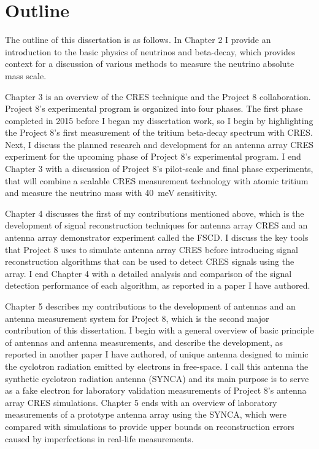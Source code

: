 \section{Outline}

The outline of this dissertation is as follows. In Chapter 2 I provide an introduction to the basic physics of neutrinos and beta-decay, which provides context for a discussion of various methods to measure the neutrino absolute mass scale. 

Chapter 3 is an overview of the CRES technique and the Project 8 collaboration. Project 8's experimental program is organized into four phases. The first phase completed in 2015 before I began my dissertation work, so I begin by highlighting the Project 8's first measurement of the tritium beta-decay spectrum with CRES. Next, I discuss the planned research and development for an antenna array CRES experiment for the upcoming phase of Project 8's experimental program. I end Chapter 3 with a discussion of Project 8's pilot-scale and final phase experiments, that will combine a scalable CRES measurement technology with atomic tritium and measure the neutrino mass with 40~meV sensitivity.

Chapter 4 discusses the first of my contributions mentioned above, which is the development of signal reconstruction techniques for antenna array CRES and an antenna array demonstrator experiment called the FSCD. I discuss the key tools that Project 8 uses to simulate antenna array CRES before introducing signal reconstruction algorithms that can be used to detect CRES signals using the array. I end Chapter 4 with a detailed analysis and comparison of the signal detection performance of each algorithm, as reported in a paper I have authored.

Chapter 5 describes my contributions to the development of antennas and an antenna measurement system for Project 8, which is the second major contribution of this dissertation. I begin with a general overview of basic principle of antennas and antenna measurements, and describe the development, as reported in another paper I have authored, of unique antenna designed to mimic the cyclotron radiation emitted by electrons in free-space. I call this antenna the synthetic cyclotron radiation antenna (SYNCA) and its main purpose is to serve as a fake electron for laboratory validation measurements of Project 8's antenna array CRES simulations. Chapter 5 ends with an overview of laboratory measurements of a prototype antenna array using the SYNCA, which were compared with simulations to provide upper bounds on reconstruction errors caused by imperfections in real-life measurements.

